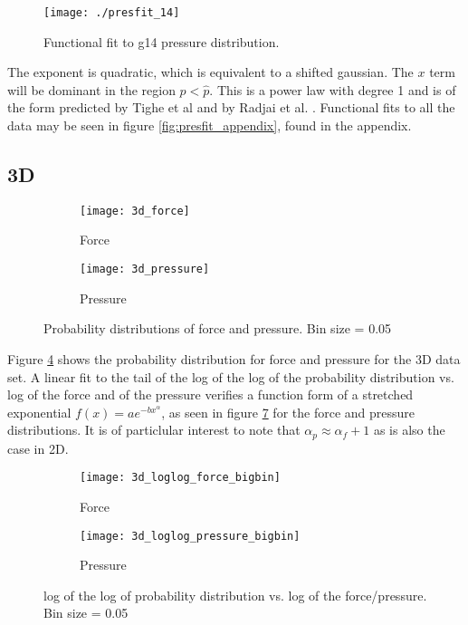 \documentclass[12pt] {article} %
\begin{document}
		
					\begin{figure}[H]
						\centering
						\texttt{[image: ./presfit\_14]}
						\caption{Functional fit to g14 pressure distribution.}
						\label{fig:presfit_14}
					\end{figure}

	The exponent is quadratic, which is equivalent to a shifted gaussian. The $x$ term will be dominant in the region $p<\hat{p}$. This is a power law with degree 1 and is of the form predicted by Tighe et al \cite{tighepaper} and by Radjai et al. \cite{radjai}.
	Functional fits to all the data may be seen in figure \ref{fig:presfit_appendix}, found in the appendix.
	
	\subsection{3D}

			\begin{figure}[H]
							\centering
						\begin{subfigure}[h]{0.49\textwidth}
							\centering
							\texttt{[image: 3d\_force]}
							\caption{Force}
							\label{fig:3d_force}
						\end{subfigure}
						\hfill
						\begin{subfigure}[h]{0.49\textwidth}
							\centering
							\texttt{[image: 3d\_pressure]}
							\caption{Pressure}
							\label{fig:3d_pressure}
						\end{subfigure} 
					\caption{Probability distributions of force and pressure. Bin size = 0.05}
					\label{fig:3d_distribution}
					\end{figure}

		Figure \ref{fig:3d_distribution} shows the probability distribution for force and pressure for the 3D data set.
		A linear fit to the tail of the log of the log of the probability distribution vs. log of the force and of the pressure verifies a function form of a stretched exponential $f(x)=ae^{-bx^\alpha}$, as seen in figure \ref{fig:loglog_3d_distribution} for the force and pressure distributions. It is of particlular interest to note that $\alpha_p \approx \alpha_f +1$ as is also the case in 2D.
		
		
					\begin{figure}[H]
									\centering
								\begin{subfigure}[h]{0.49\textwidth}
									\centering
									\texttt{[image: 3d\_loglog\_force\_bigbin]}
									\caption{Force}
									\label{fig:3d_loglog_force_bigbin}
								\end{subfigure}
								\hfill
								\begin{subfigure}[h]{0.49\textwidth}
									\centering
									\texttt{[image: 3d\_loglog\_pressure\_bigbin]}
									\caption{Pressure}
									\label{fig:3d_loglog_pressure_bigbin}
								\end{subfigure} 
							\caption{log of the log of probability distribution vs. log of the force/pressure. Bin size = 0.05}
							\label{fig:loglog_3d_distribution}
							\end{figure}
							
\end{document}
